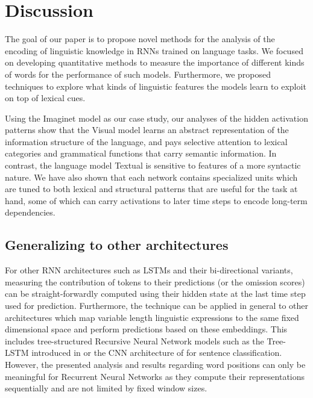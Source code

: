 \section{Discussion}
\label{sec:conclusion}

The goal of our paper is to propose novel methods for the 
analysis of the encoding of linguistic knowledge in RNNs trained on language tasks.
We focused on developing quantitative methods to measure the importance
of different kinds of words for the performance of such models. Furthermore, we
proposed techniques to explore what kinds of linguistic features the models
learn to exploit on top of lexical cues.

Using the {\sc Imaginet} model as our case study,
our analyses of the hidden activation patterns show that the {\sc Visual} model
learns an abstract representation of the information structure of the
language, and pays selective attention to lexical categories and
grammatical functions that carry semantic information. In contrast,
the language model {\sc Textual} is sensitive to features of a more
syntactic nature. We have also shown that each network contains
specialized units which are tuned to both lexical and structural
patterns that are useful for the task at hand, some of which can carry
activations to later time steps to encode long-term dependencies.  


\subsection{Generalizing to other architectures}


For other RNN architectures such as LSTMs \label{edit:omitgeneral}
and their bi-directional variants, measuring the contribution
of tokens to their predictions (or the omission scores)
can be straight-forwardly computed using their hidden state 
at the last time step used for prediction. Furthermore, the technique 
can be applied in general to other architectures which
map variable length linguistic expressions to the same fixed dimensional
space and perform predictions based on these embeddings. 
This includes tree-structured Recursive Neural Network models such as the Tree-LSTM
introduced in  or the CNN architecture of  
for sentence classification. 
However,
the presented analysis and results regarding word positions can only be meaningful
for Recurrent Neural Networks as they compute their representations sequentially and are not
limited by fixed window sizes.

